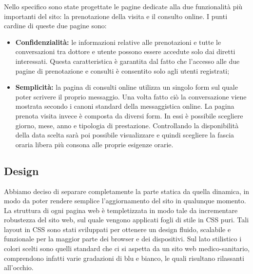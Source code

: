 Nello specifico sono state progettate le pagine dedicate alla due funzionalità più importanti del sito: la prenotazione della visita e il consulto online.
I punti cardine di queste due pagine sono:
\begin{itemize}
\item \textbf{Confidenzialità:} le informazioni relative alle prenotazioni e tutte le conversazioni tra dottore e utente possono essere accedute solo dai diretti interessati. Questa caratteristica è garantita dal fatto che l’accesso alle due pagine di prenotazione e consulti è consentito solo agli utenti registrati;


\item \textbf{Semplicità:} la pagina di consulti online utilizza un singolo form sul quale poter scrivere il proprio messaggio. Una volta fatto ciò la conversazione viene mostrata secondo i canoni standard della messaggistica online. La pagina prenota visita invece è composta da diversi form. In essi è possibile scegliere giorno, mese, anno e tipologia di prestazione. Controllando la disponibilità della data scelta sarà poi possibile visualizzare e quindi scegliere la fascia oraria libera più consona alle proprie esigenze orarie.


\end{itemize}


\subsection{Design}
Abbiamo deciso di separare completamente la parte statica da quella dinamica, in modo da poter rendere semplice l’aggiornamento del sito in qualunque momento.
La struttura di ogni pagina web è templetizzata in modo
tale da incrementare robustezza del sito web, sul quale vengono applicati fogli di stile in CSS puri.
Tali layout in CSS sono stati sviluppati per ottenere un design fluido, scalabile e funzionale per la maggior parte dei browser e dei dispositivi.
Sul lato stilistico i colori scelti sono quelli standard che ci si aspetta da un sito web medico-sanitario, comprendono infatti varie gradazioni di blu e bianco, le quali risultano rilassanti all’occhio.

